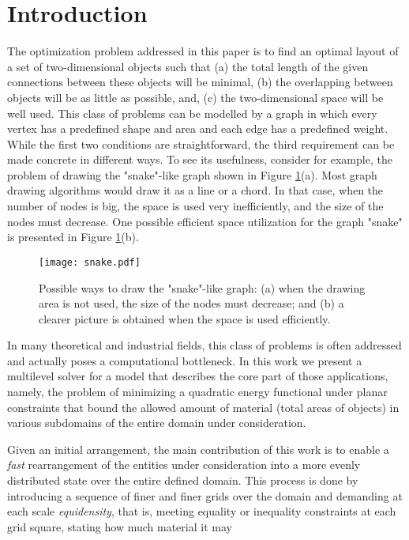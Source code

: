 \documentclass[final]{siamltex}
\begin{document}
\section{Introduction}\label{sIntro}
\par The optimization problem addressed
in this paper is to find an optimal layout of a set of
two-dimensional objects such that (a) the total length of the
given connections between these objects will be minimal, (b) the
overlapping between objects will be as little as possible, and, (c)
the two-dimensional space will be well used. This class of
problems can be modelled by a graph in which every vertex has a
predefined shape and area and each edge has a predefined weight.
While the first two conditions are straightforward, the third
requirement can be made concrete in different ways. To see its usefulness, consider for example, the problem of
drawing the "snake"-like graph shown in Figure \ref{snake}(a).
Most graph drawing algorithms would draw it as a line or a chord.
In that case, when the number of nodes is big, the space is
used very inefficiently, and the size of the nodes must
decrease.
One possible
efficient space utilization for the graph "snake" is presented in
Figure \ref{snake}(b).\begin{figure}[h]\label{snake}
\vbox{\center\texttt{[image: snake.pdf]}}
\caption{Possible ways to draw the "snake"-like graph: (a) when
the drawing area is not used, the size of the nodes must
decrease; and (b) a clearer picture is obtained when the space is
used efficiently. }
\end{figure}
\par In many theoretical and industrial fields, this class of problems
is often addressed and actually poses a computational bottleneck.
In this work we present a multilevel solver for a model that
describes the core part of those applications, namely, the problem
of minimizing a quadratic energy functional under planar
constraints that bound the allowed amount of material (total
areas of objects) in various subdomains of the entire domain under
consideration.
\par Given an initial arrangement, the main contribution of this
work is to enable a {\it fast} rearrangement of the entities under
consideration into a more evenly distributed state over the entire
defined domain. This process is done by introducing a sequence of
finer and finer grids over the domain and demanding at each scale
{\it equidensity}, that is, meeting equality or inequality
constraints at each grid square, stating how much material it may
\end{document}
